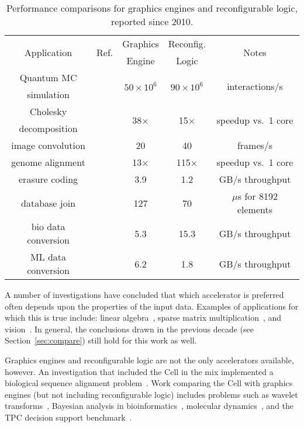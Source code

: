 \begin{table}[ht]
\centering
\caption{Performance comparisons for graphics engines and reconfigurable
logic, reported since 2010.}
\label{tbl:compare2}
\vspace{0.1in} 
\begin{tabular}{c | c | c | c | c }
\multirow{2}{*}{Application} & \multirow{2}{*}{Ref.} & Graphics & Reconfig. & \multirow{2}{*}{Notes} \\
  &   & Engine & Logic &  \\ \hline
Quantum MC& \multirow{2}{*}{\cite{wghp11}} & \multirow{2}{*}{$50 \times 10^6$} & \multirow{2}{*}{$90 \times 10^6$} & \multirow{2}{*}{interactions/s}\\
simulation  & & & \\ \hline
Cholesky & \multirow{2}{*}{\cite{ypl12}} & \multirow{2}{*}{38$\times$} & \multirow{2}{*}{15$\times$} & \multirow{2}{*}{speedup vs.~1 core}\\
decomposition  & & & \\ \hline
image convolution  & \cite{cfbs15} & 20 & 40 & frames/s\\ \hline
genome alignment & \cite{mjk+16} & 13$\times$ & 115$\times$ & speedup vs.~1 core\\ \hline
erasure coding & \cite{czs+16} & 3.9 & 1.2 & GB/s throughput\\ \hline
database join & \cite{rl17} & 127 & 70 & $\mu$s for 8192 elements\\ \hline
bio data conversion & \cite{fcb+19} & 5.3 & 15.3 & GB/s throughput\\ \hline
ML data conversion & \cite{fcb+19} & 6.2 & 1.8 & GB/s throughput\\
\end{tabular}
\end{table}

A number of investigations have concluded that which accelerator
is preferred often depends upon the properties of the input data.
Examples of applications for which this is true include:
linear algebra~\cite{gchg16,sll+13},
sparse matrix multiplication~\cite{gsbh16},
and vision~\cite{mfo+16}.
In general, the conclusions drawn in the previous decade (see
Section~\ref{sec:compare}) still hold for this work as well.

Graphics engines and reconfigurable logic are not the only accelerators
available, however.  An investigation that included the Cell in
the mix implemented a biological sequence alignment problem~\cite{bal+12}.
Work comparing the Cell with graphics engines (but not including
reconfigurable logic) includes problems such as
wavelet transforms~\cite{bck+11},
Bayesian analysis in bioinformatics~\cite{pts+12},
molecular dynamics~\cite{pts+12}, and the TPC decision support
benchmark~\cite{pts+12}.

